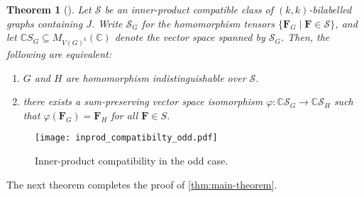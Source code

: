 \documentclass[11pt,a4paper]{article}
\theoremstyle{plain}
\newtheorem{thm}{Theorem}[section]
\theoremstyle{remark}
\theoremstyle{definition}
\def\calS{{\mathcal S}} \def\calT{{\mathcal T}} \def\calU{{\mathcal U}}
\begin{document}
\begin{thm}[{\cite[Theorem 4.6]{roberson-seppelt-arxiv}}]\label{thm:inn-prod-comp}
    Let $\calS$ be an inner-product compatible class of $(k,k)$-bilabelled graphs containing $J$. Write $\calS_G$ for the homomorphism tensors $\{\boldsymbol{F}_G \mid \boldsymbol{F} \in \mathcal{S}\}$, and let $\mathbb{C}S_G \subseteq M_{V(G)^k}(\mathbb{C})$ denote the vector space spanned by $\calS_G$. Then, the following are equivalent:
    \begin{enumerate}[label = (\roman*)]
        \item $G$ and $H$ are homomorphism indistinguishable over $\calS$. 
        \item there exists a sum-preserving vector space isomorphism $\varphi: \mathbb{C}\calS_G \to \mathbb{C}\calS_H$ such that $\varphi(\boldsymbol{F}_G) = \boldsymbol{F}_H$ for all $\boldsymbol{F} \in S$. 
    \end{enumerate}
\end{thm}


\begin{figure}[t]
  \centering
  \texttt{[image: inprod\_compatibilty\_odd.pdf]}
  \caption{Inner-product compatibility in the odd case.}
  \label{fig:inprod_compatibilty_odd}
\end{figure}

The next theorem completes the proof of \cref{thm:main-theorem}. 
\end{document}
